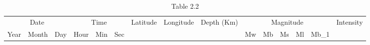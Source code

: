 



\begin{flushleft}

\begin{longtable}{|c|c|c|c|c|c|c|c|c|c|c|c|c|c|c|}
\caption{Table 2.2}
\label{table: 2.2}

\hline  %
\multicolumn{3}{|c|}{Date} & \multicolumn{3}{c|}{Time} & \multirow{2}{*}{Latitude} & \multirow{2}{*}{Longitude} & \multirow{2}{*}{Depth (Km)} & \multicolumn{5}{c|}{Magnitude} &\multirow{2}{*}{Intensity} \\ 
\cline{1-6} \cline{10-14}
 Year & Month & Day & Hour & Min & Sec & & & &  Mw & Mb & Ms & Ml & Mb_1 &\\
 \hline
\endhead


\end{longtable}
\end{flushleft}
